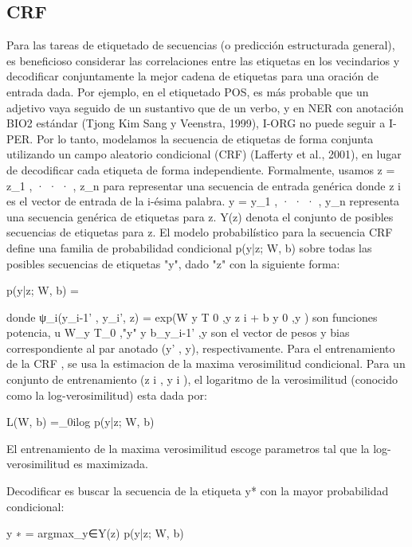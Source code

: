 \documentclass[runningheads]{llncs}
\begin{document}
\subsection{CRF}
Para las tareas de etiquetado de secuencias (o predicción estructurada general), es beneficioso considerar las correlaciones entre las etiquetas en los vecindarios y decodificar conjuntamente la mejor cadena de etiquetas para una oración de entrada dada. Por ejemplo, en el etiquetado POS, es más probable que un adjetivo vaya seguido de un sustantivo que de un verbo, y en NER con anotación BIO2 estándar (Tjong Kim Sang y Veenstra, 1999), I-ORG no puede seguir a I-PER. Por lo tanto, modelamos la secuencia de etiquetas de forma conjunta utilizando un campo aleatorio condicional (CRF) (Lafferty et al., 2001), en lugar de decodificar cada etiqueta de forma independiente. Formalmente, usamos z = {z_1 , · · · , z_n } para representar una secuencia de entrada genérica donde z i es el vector de entrada de la i-ésima palabra. y = {y_1 , · · · , y_n } representa una secuencia genérica de etiquetas para z. Y(z) denota el conjunto de posibles secuencias de etiquetas para z. El modelo probabilístico para la secuencia CRF define una familia de probabilidad condicional p(y|z; W, b) sobre todas las posibles secuencias de etiquetas "y", dado "z" con la siguiente forma:

p(y|z; W, b) = 


donde ψ_i(y_{i-1}' , y_{i}', z) = exp(W y T 0 ,y z i + b y 0 ,y ) son funciones potencia, u W_y T_0 ,"y" y  b_{y_{i-1}'} ,y son  el vector de pesos y bias correspondiente al par anotado (y' , y), respectivamente. Para el entrenamiento de la CRF , se usa la estimacion de la maxima verosimilitud condicional. Para un conjunto de entrenamiento {(z i , y i )}, el logaritmo de la verosimilitud (conocido como la log-verosimilitud) esta dada por:

L(W, b) =\sum_{0}i{log p(y|z; W, b)}


El entrenamiento de la maxima verosimilitud escoge parametros tal que la log-verosimilitud es maximizada.

Decodificar es buscar la secuencia de la etiqueta y* con la mayor probabilidad condicional:

y ∗ = argmax_{y∈Y(z)} p(y|z; W, b)
\end{document}
